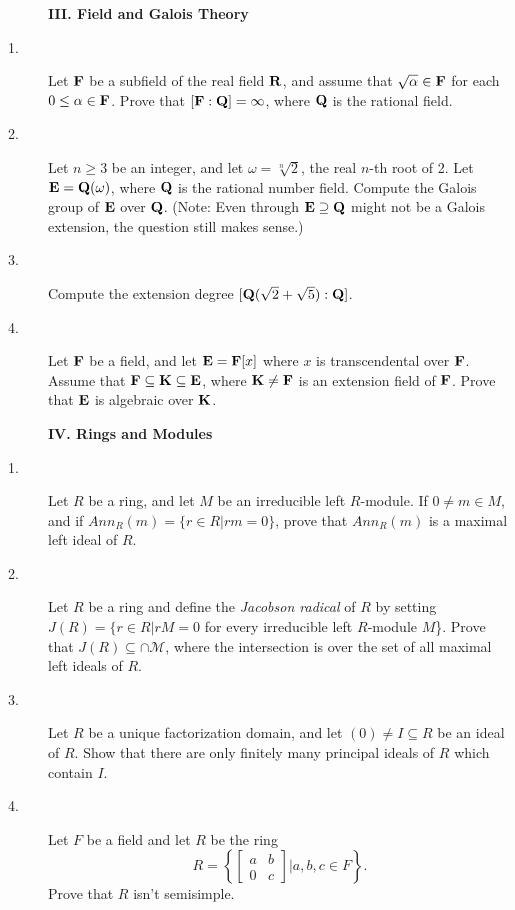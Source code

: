 \documentclass{article}
\begin{document}
\begin{description}
\centerline{{\bf III. Field and Galois Theory}}

\item[1.]
Let ${\bf F}$ be a subfield of the real field ${\bf R}$, and assume that
$\sqrt{\alpha} \in {\bf F}$ for each $0 \leq \alpha \in {\bf F}$. Prove that
$[{\bf F} : {\bf Q}] = \infty$, where ${\bf Q}$ is the rational field.

\item[2.]
Let $n \geq 3$ be an integer, and let $\omega = \sqrt[n]{2}$, the real
$n$-th root of 2. Let ${\bf E} = {\bf Q}(\omega)$, where ${\bf Q}$
is the rational number field.
Compute the Galois group of ${\bf E}$ over ${\bf Q}$. (Note: Even through
${\bf E} \supseteq {\bf Q}$ might not be a Galois extension, the question
still makes sense.)

\item[3.]
Compute the extension degree $[{\bf Q}(\sqrt{2} + \sqrt{5} ): {\bf Q}]$.

\item[4.]
Let ${\bf F}$ be a field, and let ${\bf E} = {\bf F}[x]$ where $x$ is
transcendental over
${\bf F}$. Assume that ${\bf F}\subseteq {\bf K} \subseteq {\bf E}$,
where ${\bf K} \neq {\bf F}$ is an
extension field of ${\bf F}$. Prove that ${\bf E}$ is algebraic over ${\bf K}$.

\centerline{{\bf IV. Rings and Modules}}

\item[1.]
Let $R$ be a ring, and let $M$ be an irreducible left $R$-module. If
$0 \neq m \in M$, and if $Ann_R(m) = \{r \in R|rm = 0\}$, prove that
$Ann_R(m)$ is a maximal left ideal of $R$.

\item[2.]
Let $R$ be a ring and define the {\it Jacobson radical} of $R$ by setting
$J(R) = \{r \in R|rM = 0$ for every irreducible left $R$-module $M$\}. Prove
that $J(R) \subseteq \cap {\mathcal M}$, where the intersection is over the
set of all maximal left ideals of $R$.

\item[3.]
Let $R$ be a unique factorization domain, and let $(0) \neq I \subseteq R$
be an ideal of $R$. Show that there are only finitely many principal ideals
of $R$ which contain $I$.

\item[4.]
Let $F$ be a field and let $R$ be the ring
$$R = \left\{ \left[ \begin{matrix} a&b \\ 0 & c \end{matrix} \right]
  | a,b,c \in F \right\}.$$
Prove that $R$ isn't semisimple.





\end{description}    
\end{document}
